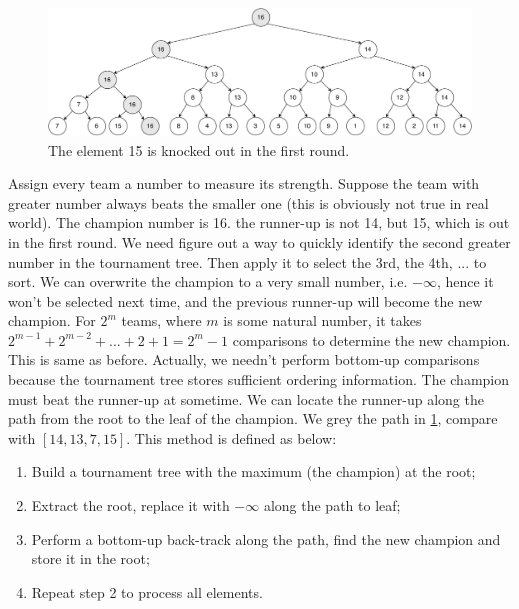 \documentclass[b5paper]{article}
\begin{document}
\begin{figure}[htbp]
  \centering
  \includegraphics[scale=0.4]{img/tournament-tree-1}
  \caption{The element 15 is knocked out in the first round.}
  \label{fig:tournament-tree-1}
\end{figure}

Assign every team a number to measure its strength. Suppose the team with greater number always beats the smaller one (this is obviously not true in real world). The champion number is 16. the runner-up is not 14, but 15, which is out in the first round. We need figure out a way to quickly identify the second greater number in the tournament tree. Then apply it to select the 3rd, the 4th, ... to sort. We can overwrite the champion to a very small number, i.e. $-\infty$, hence it won't be selected next time, and the previous runner-up will become the new champion. For $2^m$ teams, where $m$ is some natural number, it takes $2^{m-1} + 2^{m-2} + ... + 2 + 1 = 2^m - 1$ comparisons to determine the new champion. This is same as before. Actually, we needn't perform bottom-up comparisons because the tournament tree
stores sufficient ordering information. The champion must beat the runner-up at sometime. We can locate the runner-up along the path from the root to the leaf of the champion. We grey the path in \cref{fig:tournament-tree-1}, compare with $[14, 13, 7, 15]$. This method is defined as below:

\begin{enumerate}
\item Build a tournament tree with the maximum (the champion) at the root;
\item Extract the root, replace it with $-\infty$ along the path to leaf;
\item Perform a bottom-up back-track along the path, find the new champion and store it in the root;
\item Repeat step 2 to process all elements.
\end{enumerate}
\end{document}
